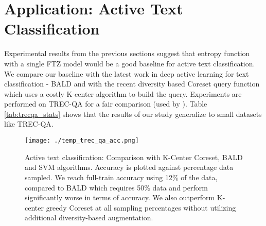 \documentclass[11pt,a4paper]{article}
\begin{document}
\section{Application: Active Text Classification}
\label{sec:comparison}
Experimental results from the previous sections suggest that entropy function with a single FTZ model would be a good baseline for active text classification. We compare our baseline with the latest work in deep active learning for text classification - BALD \cite{siddhant2018deep} and with the recent diversity based Coreset query function \cite{sener2018active} which uses a costly K-center algorithm to build the query. Experiments are performed on TREC-QA for a fair comparison (used by \cite{siddhant2018deep}).  Table \ref{tab:trecqa_stats} shows that the results of our study generalize to small datasets like TREC-QA. 


\begin{figure}[t]
\centering
\texttt{[image: ./temp\_trec\_qa\_acc.png]}
\caption{Active text classification: Comparison with K-Center Coreset, BALD and SVM algorithms. Accuracy is plotted against percentage data sampled. We reach full-train accuracy using 12\% of the data, compared to BALD which requires 50\% data and perform significantly worse in terms of accuracy. We also outperform K-center greedy Coreset at all sampling percentages without utilizing additional diversity-based augmentation.} 
\label{fig:comparison}
\vspace{-0.4cm}
\end{figure}
\end{document}
